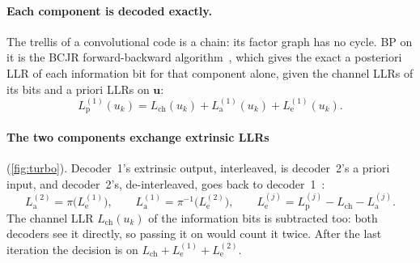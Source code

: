 \documentclass[11pt,a4paper]{article}
\newcommand{\Lch}{L_{\mathrm{ch}}}
\newcommand{\La}{L_{\mathrm{a}}}
\newcommand{\Le}{L_{\mathrm{e}}}
\newcommand{\Lp}{L_{\mathrm{p}}}
\theoremstyle{definition}
\theoremstyle{remark}
\begin{document}
\paragraph{Each component is decoded exactly.} The trellis of a convolutional code is a chain: its factor graph has no cycle. BP on it is the BCJR forward-backward algorithm~\cite{bcjr}, which gives the exact a posteriori LLR of each information bit for that component alone, given the channel LLRs of its bits and a priori LLRs on $\bm{u}$:
\begin{equation}
  \Lp^{(1)}(u_k) = \Lch(u_k) + \La^{(1)}(u_k) + \Le^{(1)}(u_k).
\end{equation}

\paragraph{The two components exchange extrinsic LLRs} (\cref{fig:turbo}). Decoder~1's extrinsic output, interleaved, is decoder~2's a priori input, and decoder~2's, de-interleaved, goes back to decoder~1~\cite{hagenauer96}:
\begin{equation}
  \La^{(2)} = \pi\big(\Le^{(1)}\big),\qquad \La^{(1)} = \pi^{-1}\big(\Le^{(2)}\big),\qquad \Le^{(j)} = \Lp^{(j)} - \Lch - \La^{(j)}.
\end{equation}
The channel LLR $\Lch(u_k)$ of the information bits is subtracted too: both decoders see it directly, so passing it on would count it twice. After the last iteration the decision is on $\Lch + \Le^{(1)} + \Le^{(2)}$.
\end{document}
